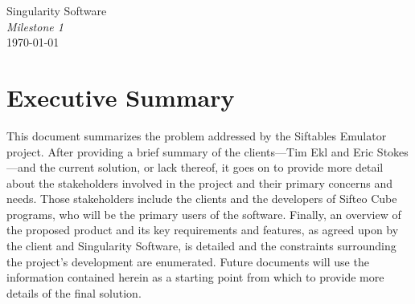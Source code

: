 \documentclass[12pt]{article}
\begin{document}
\vspace*{\fill}
        \begin{center}
                \LARGE{Singularity Software} \\
                \LARGE{\textit{Milestone 1}} \\
                \vspace{.15in}
                \large{\today} \\
        \end{center}
\vspace*{\fill}
\thispagestyle{empty}

\clearpage

\tableofcontents

\clearpage
        
\section{Executive Summary}
This document summarizes the problem addressed by the Siftables Emulator project. After providing a brief summary of the clients---Tim Ekl and Eric Stokes---and the current solution, or lack thereof, it goes on to provide more detail about the stakeholders involved in the project and their primary concerns and needs. Those stakeholders include the clients and the developers of Sifteo Cube programs, who will be the primary users of the software. Finally, an overview of the proposed product and its key requirements and features, as agreed upon by the client and Singularity Software, is detailed and the constraints surrounding the project's development are enumerated. Future documents will use the information contained herein as a starting point from which to provide more details of the final solution.
\end{document}
